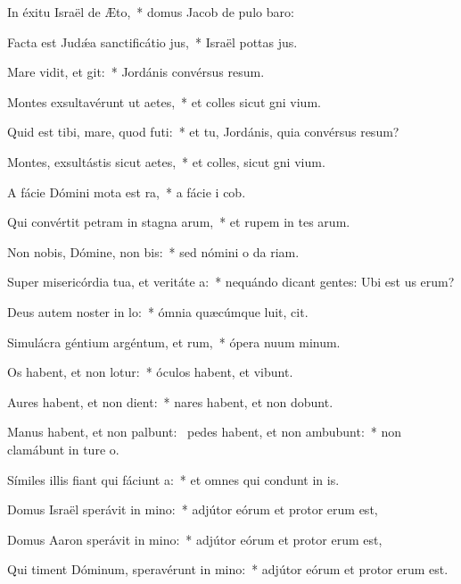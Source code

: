 \item In éxitu Israël de Æto,~* domus Jacob de pulo baro:
\item Facta est Judǽa sanctificátio jus,~* Israël pottas jus.
\item Mare vidit, et git:~* Jordánis convérsus  resum.
\item Montes exsultavérunt ut aetes,~* et colles sicut gni vium.
\item Quid est tibi, mare, quod futi:~* et tu, Jordánis, quia convérsus  resum?
\item Montes, exsultástis sicut aetes,~* et colles, sicut gni vium.
\item A fácie Dómini mota est ra,~* a fácie i cob.
\item Qui convértit petram in stagna arum,~* et rupem in tes arum.
\item Non nobis, Dómine, non bis:~* sed nómini o da riam.
\item Super misericórdia tua, et veritáte a:~* nequándo dicant gentes: Ubi est us erum?
\item Deus autem noster in lo:~* ómnia quæcúmque luit, cit.
\item Simulácra géntium argéntum, et rum,~* ópera nuum minum.
\item Os habent, et non lotur:~* óculos habent, et  vibunt.
\item Aures habent, et non dient:~* nares habent, et non dobunt.
\item Manus habent, et non palbunt:~\pscross{} pedes habent, et non ambubunt:~* non clamábunt in ture o.
\item Símiles illis fiant qui fáciunt a:~* et omnes qui condunt in is.
\item Domus Israël sperávit in mino:~* adjútor eórum et protor erum est,
\item Domus Aaron sperávit in mino:~* adjútor eórum et protor erum est,
\item Qui timent Dóminum, speravérunt in mino:~* adjútor eórum et protor erum est.
